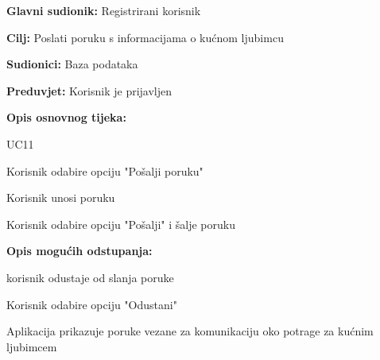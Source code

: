 \noindent {}
\begin{packed_item}
	
	\item \textbf{Glavni sudionik: }Registrirani korisnik
	\item  \textbf{Cilj:} Poslati poruku s informacijama o kućnom ljubimcu
	\item  \textbf{Sudionici:} Baza podataka
	\item  \textbf{Preduvjet:} Korisnik je prijavljen
	\item  \textbf{Opis osnovnog tijeka:}
	
	\item[] \begin{packed_enum}
		
		\item UC11
		\item Korisnik odabire opciju "Pošalji poruku"
		\item Korisnik unosi poruku
		\item Korisnik odabire opciju "Pošalji" i šalje poruku
		
	\end{packed_enum}
	
	\item  \textbf{Opis mogućih odstupanja:}
	
	\item[] \begin{packed_item}
		
		\item[3.a] korisnik odustaje od slanja poruke
		\item[] \begin{packed_enum}
			
			\item Korisnik odabire opciju "Odustani"
			\item Aplikacija prikazuje poruke vezane za komunikaciju oko potrage za kućnim ljubimcem
			
		\end{packed_enum}
		
		
	\end{packed_item}
\end{packed_item}

